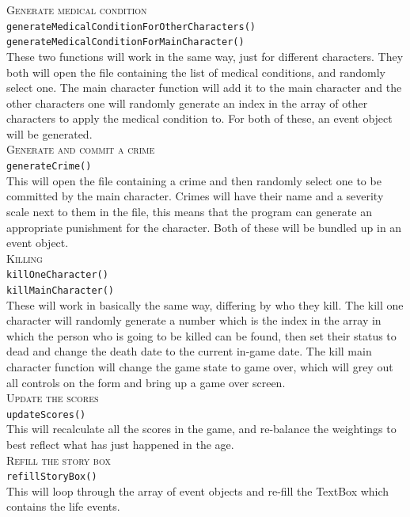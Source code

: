 \noindent \textsc{Generate medical condition}\\
\verb|generateMedicalConditionForOtherCharacters()|\\
\verb|generateMedicalConditionForMainCharacter()|\\
These two functions will work in the same way, just for different characters. They both will open the file containing the list of medical conditions, and randomly select one. The main character function will add it to the main character and the other characters one will randomly generate an index in the array of other characters to apply the medical condition to. For both of these, an event object will be generated.\\

\noindent \textsc{Generate and commit a crime}\\
\verb|generateCrime()|\\
This will open the file containing a crime and then randomly select one to be committed by the main character. Crimes will have their name and a severity scale next to them in the file, this means that the program can generate an appropriate punishment for the character. Both of these will be bundled up in an event object.\\

\noindent \textsc{Killing}\\
\verb|killOneCharacter()|\\
\verb|killMainCharacter()|\\
These will work in basically the same way, differing by who they kill. The kill one character will randomly generate a number which is the index in the array in which the person who is going to be killed can be found, then set their status to dead and change the death date to the current in-game date. The kill main character function will change the game state to game over, which will grey out all controls on the form and bring up a game over screen. \\

\noindent \textsc{Update the scores}\\
\verb|updateScores()|\\
This will recalculate all the scores in the game, and re-balance the weightings to best reflect what has just happened in the age.\\

\noindent \textsc{Refill the story box}\\
\verb|refillStoryBox()|\\
This will loop through the array of event objects and re-fill the TextBox which contains the life events.\\

